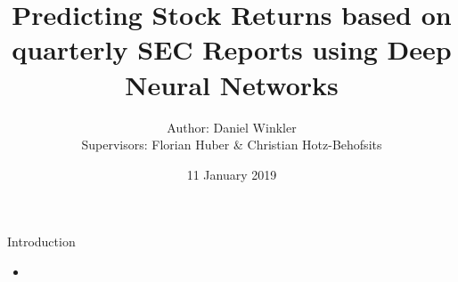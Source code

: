 \documentclass{beamer}
\title{Predicting Stock Returns based on quarterly SEC Reports using Deep Neural Networks}
\author{Author: Daniel Winkler \\ Supervisors: Florian Huber \& Christian Hotz-Behofsits}
\date{11 January 2019}
\begin{document}
\begin{frame}[plain]
  \titlepage
\end{frame}


\begin{frame}{Introduction}
  \begin{itemize}
  \item 
  \end{itemize}
\end{frame}
\end{document}
